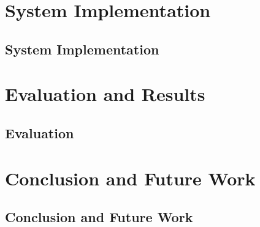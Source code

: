 \documentclass[article,type=msc,colorback,12pt,accentcolor=tud7b]{tudthesis}
\begin{document}
 \cleardoublepage
 \section{System Implementation}
 \subsection{System Implementation}

 \cleardoublepage	  
 \section{Evaluation and Results}	  
 \subsection{Evaluation}
 
 \cleardoublepage
 \section{Conclusion and Future Work}	  
 \subsection{Conclusion and Future Work}

\clearpage
	  

	  
\end{document}
